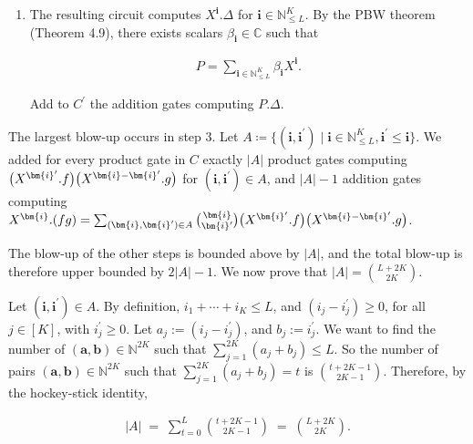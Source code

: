 \begin{enumerate}
\item 
 


The resulting circuit computes $X^{\bm{i}}.\Delta$ for ${\bm{i}}\in\mathbb{N}^{K}_{\leq L}$.
By the PBW theorem (Theorem 4.9), there exists scalars $\beta_{\bm{i}}\in\mathbb{C}$ such that



\[\begin{aligned}
\displaystyle P=\sum_{\bm{i}\in\mathbb{N}^{K}_{\leq L}}\beta_{\bm{i}}X^{\bm{i}}.
\end{aligned}\]


Add to $C^{\prime}$ the addition gates computing $P.\Delta$.





\end{enumerate}


The largest blow-up occurs in step 3.
Let $A\coloneqq\{({\bm{i}},{\bm{i}}^{\prime})\mid{\bm{i}}\in\mathbb{N}^{K}_{\leq L},{\bm{i}}^{\prime}\leq{\bm{i}}\}$.
We added for every product gate in $C$ exactly $|A|$ product gates computing $\big{(}X^{{\bm{i}}^{\prime}}.f\big{)}\big{(}X^{{\bm{i}}-{\bm{i}}^{\prime}}.g\big{)}$ for $(\bm{i},\bm{i}^{\prime})\in A$,
and $|A|-1$ addition gates computing $X^{\bm{i}}.(fg)=\sum_{(\bm{i},\bm{i}^{\prime})\in A}\binom{{\bm{i}}}{{\bm{i}}^{\prime}}\big{(}X^{{\bm{i}}^{\prime}}.f\big{)}\big{(}X^{{\bm{i}}-{\bm{i}}^{\prime}}.g\big{)}$.





The blow-up of the other steps is bounded above by $|A|$, and the total blow-up is therefore upper bounded by $2|A|-1$.
We now prove that
$|A|=\binom{L+2K}{2K}$.





Let $(\bm{i},\bm{i}^{\prime})\in A$. By definition, $i_{1}+\cdots+i_{K}\leq L$, and $(i_{j}-i_{j}^{\prime})\geq 0$, for all $j\in[K]$, with $i_{j}^{\prime}\geq 0$. Let $a_{j}:=(i_{j}-i_{j}^{\prime})$, and $b_{j}:=i_{j}^{\prime}$. We want to find the number of $(\bm{a},\bm{b})\in\mathbb{N}^{2K}$ such that $\sum_{j=1}^{2K}(a_{j}+b_{j})\leq L$. So the number of pairs $(\bm{a},\bm{b})\in\mathbb{N}^{2K}$ such that $\sum_{j=1}^{2K}(a_{j}+b_{j})=t$ is $\binom{t+2K-1}{2K-1}$. Therefore, by the hockey-stick identity,



\[\begin{aligned}
|A|\;=\;\sum_{t=0}^{L}\binom{t+2K-1}{2K-1}\;=\;\binom{L+2K}{2K}.
\end{aligned}\]




